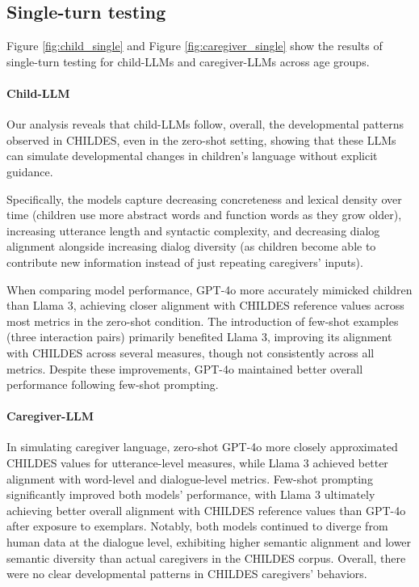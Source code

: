 \subsection{Single-turn testing}

Figure \ref{fig:child_single} and Figure \ref{fig:caregiver_single} show the results of single-turn testing for child-LLMs and caregiver-LLMs across age groups.

\paragraph{Child-LLM} 

Our analysis reveals that child-LLMs follow, overall, the developmental patterns observed in CHILDES, even in the zero-shot setting, showing that these LLMs can simulate developmental changes in children's language without explicit guidance.  

Specifically, the models capture decreasing concreteness and lexical density over time (children use more abstract words and function words as they grow older), increasing utterance length and syntactic complexity, and decreasing dialog alignment alongside increasing dialog diversity (as children become able to contribute new information instead of just repeating caregivers' inputs). 


When comparing model performance, GPT-4o more accurately mimicked children than Llama 3, achieving closer alignment with CHILDES reference values across most metrics in the zero-shot condition. The introduction of few-shot examples (three interaction pairs) primarily benefited Llama 3, improving its alignment with CHILDES across several measures, though not consistently across all metrics. Despite these improvements, GPT-4o maintained better overall performance following few-shot prompting.



\paragraph{Caregiver-LLM} In simulating caregiver language, zero-shot GPT-4o more closely approximated CHILDES values for utterance-level measures, while Llama 3 achieved better alignment with word-level and dialogue-level metrics. Few-shot prompting significantly improved both models' performance, with Llama 3 ultimately achieving better overall alignment with CHILDES reference values than GPT-4o after exposure to exemplars. Notably, both models continued to diverge from human data at the dialogue level, exhibiting higher semantic alignment and lower semantic diversity than actual caregivers in the CHILDES corpus. Overall, there were no clear developmental patterns in CHILDES caregivers' behaviors. 






